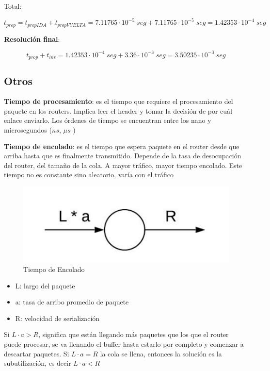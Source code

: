 \documentclass[titlepage,a4paper]{article}
\begin{document}
Total:

$$t_{prop} = t_{propIDA} + t_{propVUELTA}  =  7.11765 \cdot 10^{-5} \; seg + 7.11765 \cdot 10^{-5} \; seg = 1.42353\cdot10^{-4} \; seg$$

\textbf{Resolución final}:

$$ t_{prop} + t_{ins} = 1.42353\cdot10^{-4} \; seg + 3.36 \cdot 10^{-3} \; seg = 3.50235 \cdot 10^{-3} \; seg$$


\subsection{Otros}

\textbf{Tiempo de procesamiento}: es el tiempo que requiere el procesamiento del paquete en los routers. Implica leer el header y tomar la decisión de por cuál enlace enviarlo. Los órdenes de tiempo se encuentran entre los nano y microsegundos ($ns$, $\mu s$ )

\textbf{Tiempo de encolado}: es el tiempo que espera paquete en el router desde que arriba hasta que es finalmente transmitido. Depende de la tasa de desocupación del router, del tamaño de la cola. A mayor tráfico, mayor tiempo encolado. Este tiempo no es constante sino aleatorio, varía con el tráfico

\begin{figure}[H]
\centering
\includegraphics[width=\textwidth]{tiempoEncolado.png}
\caption{Tiempo de Encolado}
\end{figure}

\begin{itemize}
    \item L: largo del paquete
    \item a: tasa de arribo promedio de paquete
    \item R: velocidad de serialización
\end{itemize}

Si $L \cdot a > R$, significa que están llegando más paquetes que los que el router puede procesar, se va llenando el buffer hasta estarlo por completo y comenzar a descartar paquetes. Si $L \cdot a = R$ la cola se llena, entonces la solución es la subutilización, es decir $L \cdot a < R$
\end{document}
